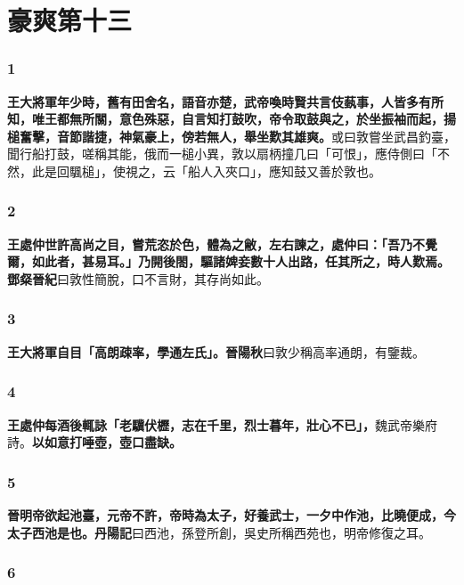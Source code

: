 \chapter{豪爽第十三}

\subsection*{1}

\textbf{王大將軍年少時，舊有田舍名，語音亦楚，武帝喚時賢共言伎蓺事，人皆多有所知，唯王都無所關，意色殊惡，自言知打鼓吹，帝令取鼓與之，於坐振袖而起，揚槌奮擊，音節諧捷，神氣豪上，傍若無人，舉坐歎其雄爽。}{\footnotesize 或曰敦嘗坐武昌釣臺，聞行船打鼓，嗟稱其能，俄而一槌小異，敦以扇柄撞几曰「可恨」，應侍側曰「不然，此是回颿槌」，使視之，云「船人入夾口」，應知鼓又善於敦也。}

\subsection*{2}

\textbf{王處仲世許高尚之目，嘗荒恣於色，體為之敝，左右諫之，處仲曰：「吾乃不覺爾，如此者，甚易耳。」乃開後閤，驅諸婢妾數十人出路，任其所之，時人歎焉。}{\footnotesize \textbf{鄧粲晉紀}曰敦性簡脫，口不言財，其存尚如此。}

\subsection*{3}

\textbf{王大將軍自目「高朗疎率，學通左氏」。}{\footnotesize \textbf{晉陽秋}曰敦少稱高率通朗，有鑒裁。}

\subsection*{4}

\textbf{王處仲每酒後輒詠「老驥伏櫪，志在千里，烈士暮年，壯心不已」，}{\footnotesize 魏武帝樂府詩。}\textbf{以如意打唾壺，壺口盡缺。}

\subsection*{5}

\textbf{晉明帝欲起池臺，元帝不許，帝時為太子，好養武士，一夕中作池，比曉便成，今太子西池是也。}{\footnotesize \textbf{丹陽記}曰西池，孫登所創，吳史所稱西苑也，明帝修復之耳。}

\subsection*{6}

